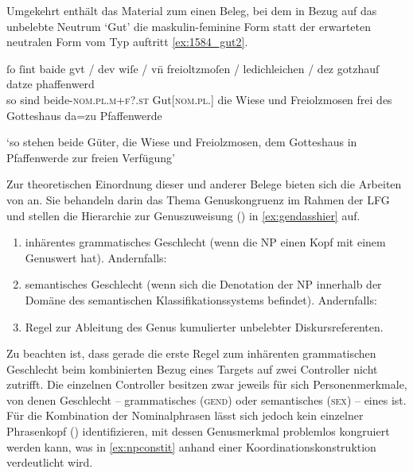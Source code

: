 Umgekehrt enthält das Material zum \CAO{} einen Beleg, bei dem in
Bezug auf das un\-belebte Neutrum  `Gut' die maskulin-feminine
Form  statt der erwarteten neutralen Form vom Typ 
auftritt \cref{ex:1584_gut2}.

\begin{exe}
\ex\label{ex:1584_gut2}
	\gll ſo ſint baide gvt / dev wiſe / vn̄ freioltzmoſen /
			ledichleichen / dez gotzhauſ datze phaffenwerd \\
		so sind beide-\textsc{nom.pl.m+f?\subI.st} Gut[\textsc{nom.pl.\NeutI}] {} die
			Wiese {} und Freiolzmosen {} frei {} des Gotteshaus da=zu
			Pfaffenwerde \\
	\begin{taggedline}{\parencites(Kl.~Herrenchiemsee, Kr.~Rosenheim, 1292)[\pno~1584, 727.26--27]{cao2}}
		\trans `so stehen beide Güter, die Wiese und Freiolzmosen, dem
		Gotteshaus in Pfaffenwerde zur freien Verfügung'
	\end{taggedline}
\end{exe}

Zur theoretischen Einordnung dieser und anderer Belege bieten sich die Arbeiten
von \textcites[171--195]{wechslerzlatic2003}{wechsler2009} an. Sie behandeln
darin das Thema Genus\-kongruenz im Rahmen der LFG \autocites(vgl.~%
\cref{sec:lfgkongr}){bresnanetal2016} und stellen die Hierarchie zur
Genuszuweisung () in \cref{ex:gendasshier} auf.

\begin{exe}
\ex\label{ex:gendasshier}
	\begin{taggedline}{\parencites[nach][584]{wechsler2009}[vgl.][195]{wechslerzlatic2003}}
		\begin{enumerate}[noitemsep]
			\item inhärentes grammatisches Geschlecht (wenn die NP einen Kopf
				mit einem Genuswert hat). Andernfalls:
			\item semantisches Geschlecht (wenn sich die Denotation der NP
				innerhalb der Domäne des semantischen Klassifikationssystems
				befindet). Andernfalls:
			\item Regel zur Ableitung des Genus kumulierter unbelebter 
				Diskursreferenten.
		\end{enumerate}
	\end{taggedline}
\end{exe}

Zu beachten ist, dass gerade die erste Regel zum inhärenten grammatischen
Geschlecht beim kombinierten Bezug eines Targets auf zwei Controller nicht
zutrifft. Die einzelnen Controller besitzen zwar jeweils für sich
Personenmerkmale, von denen Geschlecht -- grammatisches (\textsc{gend}) oder
semantisches (\textsc{sex}) -- eines ist. Für die Kombination der Nominalphrasen lässt
sich jedoch kein einzelner Phrasenkopf () identifizieren, mit dessen
Genusmerkmal problemlos kongruiert werden kann, was in \cref{ex:npconstit}
anhand einer Koordinations\-konstruktion verdeutlicht wird.

